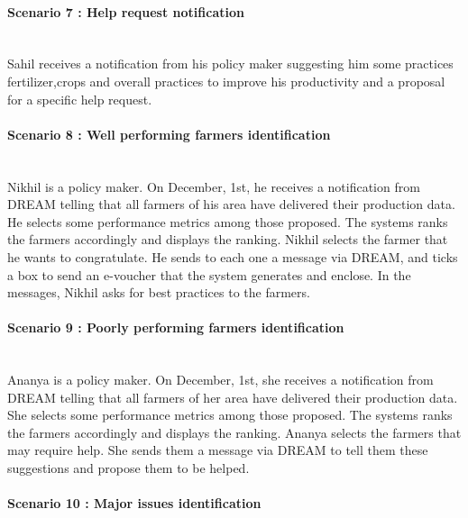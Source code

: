 \paragraph{Scenario 7 : Help request notification}\mbox{} \\

Sahil receives a notification from his policy maker suggesting him some practices fertilizer,crops and overall practices to improve his productivity and a proposal for a specific help request.

\paragraph{Scenario 8 : Well performing farmers identification}\mbox{} \\

Nikhil is a policy maker. On December, 1st, he receives a notification from DREAM telling that all farmers of his area have delivered their production data. He selects some performance metrics among those proposed. The systems ranks the farmers accordingly and displays the ranking. Nikhil selects the farmer that he wants to congratulate. He sends to each one a message via DREAM, and ticks a box to send an e-voucher that the system generates and enclose. In the messages, Nikhil asks for best practices to the farmers.

\paragraph{Scenario 9 : Poorly performing farmers identification}\mbox{} \\
Ananya is a policy maker. On December, 1st, she receives a notification from DREAM telling that all farmers of her area have delivered their production data. She selects some performance metrics among those proposed. The systems ranks the farmers accordingly and displays the ranking. Ananya selects the farmers that may require help. She sends them a message via DREAM to tell them these suggestions and propose them to be helped.

\paragraph{Scenario 10 : Major issues identification}\mbox{} \\


